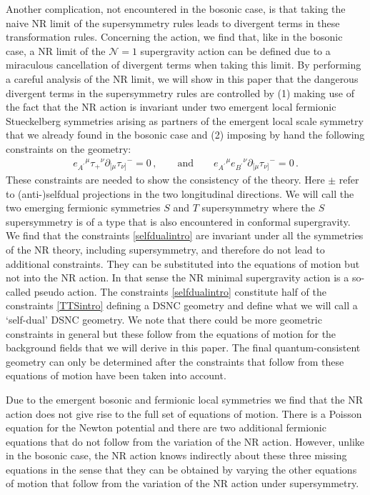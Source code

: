\documentclass[a4paper,10pt,openany]{article}
\begin{document}
	
	Another complication, not encountered in the bosonic case,  is that taking the naive NR limit of the supersymmetry rules leads to divergent terms in these transformation rules. Concerning the action, we find that, like in the bosonic case, a NR limit of the $\mathcal{N}=1$ supergravity action can be defined due to a miraculous cancellation of divergent terms when  taking this  limit.
	By performing a careful analysis of the NR limit, we will show in this paper that the dangerous divergent terms in the supersymmetry rules are controlled by (1) making use of the fact that the NR action is invariant under two emergent local fermionic Stueckelberg symmetries arising  as partners of the emergent local scale symmetry that we already found in the bosonic case and (2) imposing by hand the following constraints on the geometry:
	\begin{align} \label{selfdualintro}
		e_{A^\prime}{}^\mu \tau_{+}{}^\nu \partial_{[\mu} \tau_{\nu]}{}^- =0\,,\qquad\mathrm{and}\qquad e_{A^\prime}{}^\mu e_{B^\prime}{}^\nu \partial_{[\mu} \tau_{\nu]}{}^- =0\,.
	\end{align}
	These constraints are needed to show the consistency of the theory. Here $\pm$ refer to (anti-)selfdual projections in the two longitudinal directions. We will call the two emerging fermionic symmetries
	$S$ and $T$ supersymmetry where the $S$ supersymmetry is of a type that is also encountered in conformal supergravity. We find that the constraints \eqref{selfdualintro} are invariant under all the symmetries of the NR theory, including supersymmetry, and therefore do not lead to additional constraints.  They can be substituted  into the equations of motion but not  into the NR action. In that sense the NR minimal supergravity action is a so-called pseudo action.
	The constraints \eqref{selfdualintro} constitute half of the constraints \eqref{TTSintro} defining a DSNC geometry and define  what we will call a `self-dual' DSNC geometry. We note that there could be more geometric constraints in general but these follow from the equations of motion for the background fields that we will derive in this paper. The final quantum-consistent geometry can only be determined after the constraints that follow from these equations of motion have been taken into account.
	
	
	Due to the emergent bosonic and fermionic local symmetries we find that the NR  action does not give rise to the full set of equations of motion. There is a  Poisson equation for the Newton potential and there are  two additional fermionic equations that do not follow from the variation of the NR action. However, unlike in the bosonic case, the NR action knows indirectly about these three missing equations in the sense that they can be obtained by varying the other equations of motion that follow from the variation of the NR action under supersymmetry.
	
\end{document}
